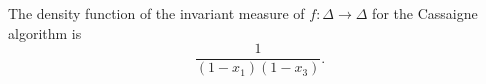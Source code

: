 The density function of the invariant measure of $f:\Delta\to\Delta$ for
the Cassaigne algorithm is
\[
\frac{1}{(1-x_1)(1-x_3)}.
\]
